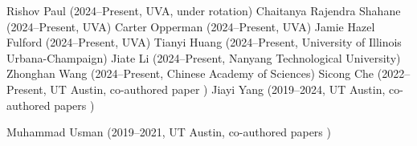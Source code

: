 
 { Rishov Paul (2024--Present, UVA, under rotation)}
 { Chaitanya Rajendra Shahane (2024--Present, UVA)}
 {Carter Opperman (2024--Present, UVA)}
 {Jamie Hazel Fulford (2024--Present, UVA)}
 { Tianyi Huang (2024--Present, University of Illinois Urbana-Champaign)}
 { Jiate Li (2024--Present, Nanyang Technological University)}
 { Zhonghan Wang (2024--Present, Chinese Academy of Sciences)}
 {Sicong Che (2022--Present, UT Austin, co-authored paper \cite{learnability})}
 {Jiayi Yang (2019--2024,  UT Austin, co-authored papers \cite{alloymc,learnability})}

 {Muhammad Usman (2019--2021,  UT Austin, co-authored papers \cite{testmc,symmetrystudy,mlmodelstudy,mlrelationstudy,leaninginvariants})}

